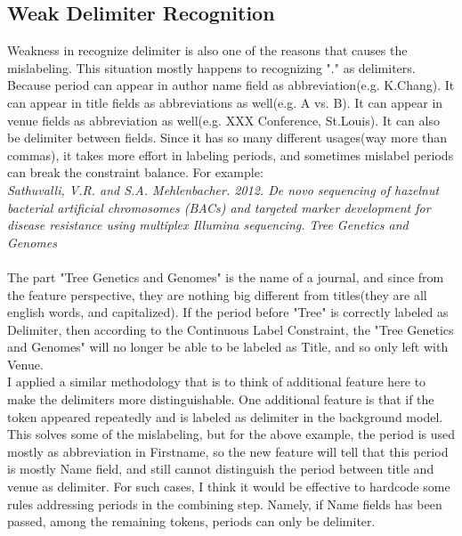 \documentclass[11pt]{article}
\begin{document}
%
%




\subsection{Weak Delimiter Recognition}
Weakness in recognize delimiter is also one of the reasons that causes the mislabeling. This situation mostly happens to recognizing "." as delimiters. Because period can appear in author name field as abbreviation(e.g. K.Chang). It can appear in title fields as abbreviations as well(e.g. A vs. B). It can appear in venue fields as abbreviation as well(e.g. XXX Conference, St.Louis). It can also be delimiter between fields. Since it has so many different usages(way more than commas), it takes more effort in labeling periods, and sometimes mislabel periods can break the constraint balance. For example: \\

\textit{
	Sathuvalli, V.R. and S.A. Mehlenbacher. 2012. De novo sequencing of hazelnut bacterial artificial chromosomes (BACs) and targeted marker development for disease resistance using multiplex Illumina sequencing. Tree Genetics and Genomes
}\\\\
The part "Tree Genetics and Genomes" is the name of a journal, and since from the feature perspective, they are nothing big different from titles(they are all english words, and capitalized). If the period before "Tree" is correctly labeled as Delimiter, then according to the Continuous Label Constraint, the "Tree Genetics and Genomes" will no longer be able to be labeled as Title, and so only left with Venue. \\

I applied a similar methodology that is to think of additional feature here to make the delimiters more distinguishable. One additional feature is that if the token appeared repeatedly and is labeled as delimiter in the background model. This solves some of the mislabeling, but for the above example, the period is used mostly as abbreviation in Firstname, so the new feature will tell that this period is mostly Name field, and still cannot distinguish the period between title and venue as delimiter. For such cases, I think it would be effective to hardcode some rules addressing periods in the combining step. Namely, if Name fields has been passed, among the remaining tokens, periods can only be delimiter.
\end{document}
